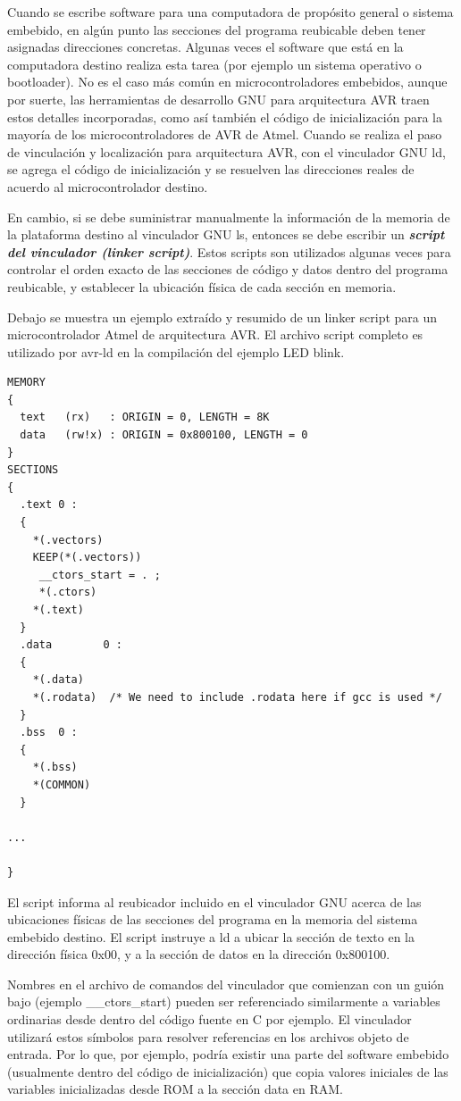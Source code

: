 \documentclass[output=paper, 
colorlinks,
citecolor=brown,
newtxmath
]{langscibook}
\begin{document}
Cuando se escribe software para una computadora de propósito general o
sistema embebido, en algún punto las secciones del programa reubicable
deben tener asignadas direcciones concretas. Algunas veces el software
que está en la computadora destino realiza esta tarea (por ejemplo un sistema
operativo o bootloader). No es el caso más común en microcontroladores
embebidos, aunque por suerte, las herramientas de desarrollo GNU 
para arquitectura AVR traen estos detalles 
incorporadas, como así también el código de inicialización para la mayoría
de los microcontroladores de AVR de Atmel.
Cuando se realiza el paso de vinculación y localización para arquitectura AVR,
con el vinculador GNU ld, se agrega el código de inicialización y se 
resuelven las direcciones reales de acuerdo al microcontrolador destino.

En cambio, si se debe suministrar manualmente la información de la memoria 
de la plataforma destino al vinculador GNU ls, entonces se debe escribir 
un \textit{\textbf{script del vinculador (linker script)}}.
Estos scripts son utilizados algunas veces para controlar el orden exacto de
las secciones de código y datos dentro del programa reubicable, y establecer
la ubicación física de cada sección en memoria.


Debajo se muestra un ejemplo extraído y resumido de un linker script
para un microcontrolador Atmel de arquitectura AVR. El archivo script
completo es utilizado por avr-ld en la compilación del ejemplo LED blink.

\begin{verbatim}
MEMORY
{
  text   (rx)   : ORIGIN = 0, LENGTH = 8K
  data   (rw!x) : ORIGIN = 0x800100, LENGTH = 0
}
SECTIONS
{
  .text 0 :
  {
    *(.vectors)
    KEEP(*(.vectors))
     __ctors_start = . ;
     *(.ctors)
    *(.text)
  }
  .data        0 :
  {
    *(.data)
    *(.rodata)  /* We need to include .rodata here if gcc is used */
  }
  .bss  0 :
  {
    *(.bss)
    *(COMMON)
  }

...

}
\end{verbatim}

El script informa al reubicador incluido en el vinculador GNU acerca de las ubicaciones
físicas de las secciones del programa en la memoria del sistema embebido destino.
El script instruye a ld a ubicar la sección de texto en la dirección física 0x00,
y a la sección de datos en la dirección 0x800100.

Nombres en el archivo de comandos del vinculador que comienzan con un guión bajo
(ejemplo \_\_ctors\_start) pueden ser referenciado similarmente a variables ordinarias
desde dentro del código fuente en C por ejemplo. El vinculador utilizará 
estos símbolos
para resolver referencias en los archivos objeto de entrada.
Por lo que, por ejemplo, podría existir una parte del software embebido (usualmente
dentro del código de inicialización) que copia valores iniciales de las variables
inicializadas desde ROM a la sección data en RAM.
\end{document}
